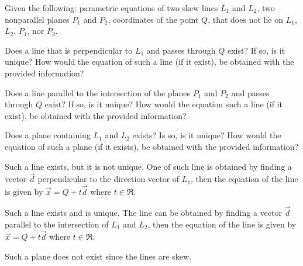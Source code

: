 
\begin{Exercise}[
name={},
title={}, 
difficulty=0,
origin={\cite{MB}}]
Given the following: parametric equations of two skew lines $L_1$ and $L_2$, two nonparallel planes $P_1$ and $P_2$, coordinates of the point $Q$, that does not lie on $L_1$, $L_2$, $P_1$, nor $P_2$. 

\Question Does a line that is perpendicular to $L_1$ and passes through $Q$ exist?
If so, is it unique? How would the equation of such a line (if it exist), be obtained with the provided information?

\Question Does a line parallel to the intersection of the planes $P_1$ and $P_2$ and passes through $Q$ exist? If so, is it unique?
How would the equation such a line (if it exist), be obtained with the provided information?

\Question Does a plane containing $L_1$ and $L_2$ exists? Is so, is it unique? How would the equation of such a plane (if it exists), be obtained with the provided information?
\end{Exercise}

\begin{Answer}
\Question Such a line exists, but it is not unique.  One of such line is obtained by finding a vector $\vec{d}$ perpendicular to the direction vector of $L_1$, then the equation of the line is given by $\vec{x}=Q+t\vec{d}$ where $t\in\Re$.

\Question Such a line exists and is unique.  The line can be obtained by finding a vector $\vec{d}$ parallel to the intersection of $L_1$ and $L_2$, then the equation of the line is given by $\vec{x}=Q+t\vec{d}$ where $
t\in\Re$.

\Question Such a plane does not exist since the lines are skew.
\end{Answer}
